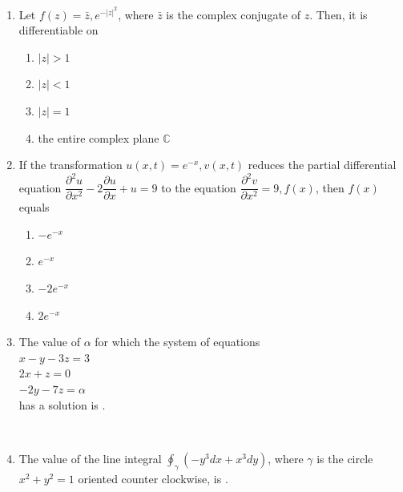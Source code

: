 \documentclass[journal,12pt,onecolumn]{IEEEtran}
\begin{document}
\begin{enumerate}[label=\arabic*)]
\vspace{0.5cm}

\item Let $f(z)=\bar{z}, e^{-|z|^2}$, where $\bar{z}$ is the complex conjugate of $z$. Then, it is differentiable on
\hfill{} \\

\vspace{0.2cm}
\begin{enumerate}[label=\alph*)]
\item $|z|>1$
\item $|z|<1$
\item $|z|=1$
\item the entire complex plane $\mathbb{C}$
\end{enumerate}

\vspace{0.5cm}

\item If the transformation $u(x,t)=e^{-x},v(x,t)$ reduces the partial differential equation $\dfrac{\partial^2 u}{\partial x^2}-2\dfrac{\partial u}{\partial x}+u=9$ to the equation $\dfrac{\partial^2 v}{\partial x^2}=9,f(x)$, then $f(x)$ equals
\hfill{} \\

\vspace{0.2cm}
\begin{enumerate}[label=\alph*)]
\item $-e^{-x}$
\item $e^{-x}$
\item $-2e^{-x}$
\item $2e^{-x}$
\end{enumerate}

\newpage

\item The value of $\alpha$ for which the system of equations\\
$x-y-3z=3$\\
$2x+z=0$\\
$-2y-7z=\alpha$\\
 has a solution is \underline{\hspace{2cm}}.

\hfill{} \\
\vspace{1.0cm}

\item The value of the line integral $\displaystyle \oint_{\gamma}(-y^3dx + x^3dy)$, where $\gamma$ is the circle $x^2+y^2=1$ oriented counter clockwise, is \underline{\hspace{2cm}}.


\end{enumerate}
\end{document}
